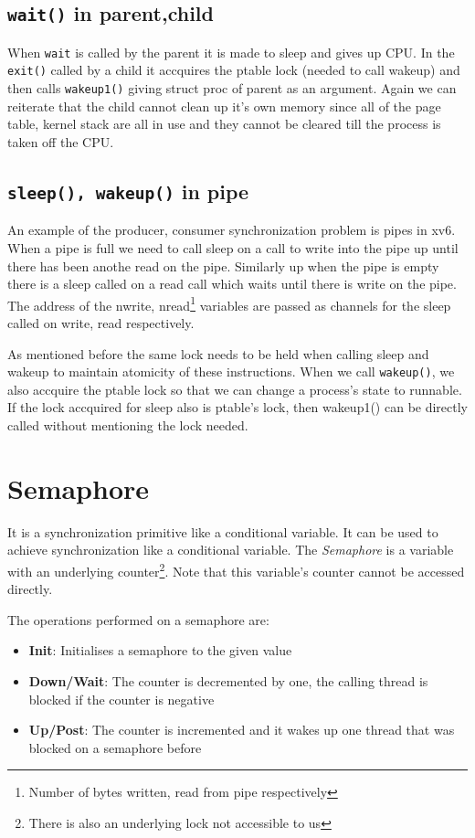 \documentclass[12pt]{article}
\begin{document}
\subsection{\texttt{wait()} in parent,child}
When \texttt{wait} is called by the parent it is made to sleep and gives up CPU. In the \texttt{exit()} called by a child it 
accquires the ptable lock (needed to call wakeup) and then calls \texttt{wakeup1()} giving struct proc of parent as an argument. Again we can reiterate that the 
child cannot clean up it's own memory since all of the page table, kernel stack are all in use and they cannot be cleared till the process is taken off the CPU. 

\subsection{\texttt{sleep(), wakeup()} in pipe}
An example of the producer, consumer synchronization problem is pipes in xv6. When a pipe is full we need to call sleep on a call to write into the pipe up until there has been anothe read on the pipe. 
Similarly up when the pipe is empty there is a sleep called on a read call which waits until there is write on the pipe. The address of the nwrite, nread\footnote{Number of bytes written, read from pipe respectively} variables are passed as channels for the sleep called on write, read respectively.


As mentioned before the same lock needs to be held when calling sleep and wakeup to maintain atomicity of these instructions. When we call \texttt{wakeup()}, we also accquire the ptable lock so that 
we can change a process's state to runnable. If the lock accquired for sleep also is ptable's lock, then wakeup1() can be directly called without mentioning the lock needed.  


\section{Semaphore}
It is a synchronization primitive like a conditional variable. It can be used to achieve synchronization like a conditional variable. 
The \textit{Semaphore} is a variable with an underlying counter\footnote{There is also an underlying lock not accessible to us}. Note that this variable's counter cannot be accessed directly.

The operations performed on a semaphore are:
\begin{itemize}[topsep = 0cm, partopsep =  0cm, parsep = 0cm, itemsep = 0cm]
    \item \textbf{Init}: Initialises a semaphore to the given value
    \item \textbf{Down/Wait}: The counter is decremented by one, the calling thread is blocked if the counter is negative
    \item \textbf{Up/Post}: The counter is incremented and it wakes up one thread that was blocked on a semaphore before
\end{itemize}
\end{document}
